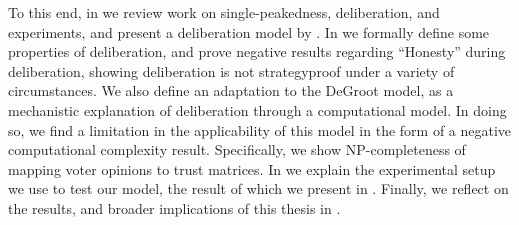 To this end, in  we review work on
single-peakedness, deliberation, and experiments, and present a
deliberation model by \citet{radDeliberationSinglePeakednessCoherent2021}. In
 we formally define some properties of deliberation, and prove
negative results regarding ``Honesty'' during deliberation, showing
deliberation is not strategyproof under a variety of circumstances. We also
define an adaptation to the DeGroot model, as a mechanistic explanation of
deliberation through a computational model. In doing so, we find a limitation
in the applicability of  this model in the form of a negative computational
complexity result. Specifically, we show NP-completeness of mapping voter opinions to trust
matrices. In  we explain the experimental setup we use to test
our model, the result of which we present in .
Finally, we reflect on the results, and broader implications of this thesis in .

